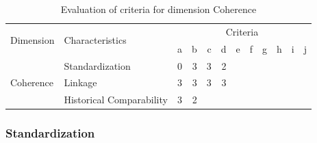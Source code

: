 \begin{table}[htbp]
    \centering

    \begin{tabular}{llrrrrrrrrrr}
        \toprule
        \multirow{2}{*}{Dimension}  & \multirow{2}{*}{Characteristics}  & \multicolumn{10}{c}{Criteria}         \\ \cmidrule(lr){3-12}
                                    &                                   & a & b & c & d & e & f & g & h & i & j \\ \midrule
        \multirow{3}{*}{Coherence}  & Standardization                   & 0 & 3 & 3 & 2 &   &   &   &   &   &   \\
                                    & Linkage                           & 3 & 3 & 3 & 3 &   &   &   &   &   &   \\
                                    & Historical Comparability          & 3 & 2 &   &   &   &   &   &   &   &   \\
        \bottomrule
    \end{tabular}

    \caption{Evaluation of criteria for dimension Coherence}
    \label{table:coherence-benchmark}
\end{table}
\FloatBarrier

\subsubsection{Standardization}

